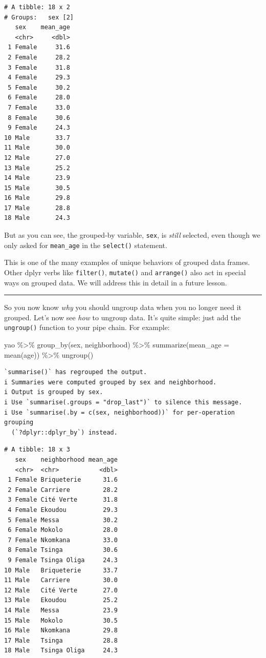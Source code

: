 \documentclass[
  letterpaper,
  DIV=11,
  numbers=noendperiod]{scrreprt}
\newenvironment{Shaded}{\begin{snugshade}}{\end{snugshade}}
\newcommand{\AttributeTok}[1]{\textcolor[rgb]{0.40,0.45,0.13}{#1}}
\newcommand{\FunctionTok}[1]{\textcolor[rgb]{0.28,0.35,0.67}{#1}}
\newcommand{\NormalTok}[1]{\textcolor[rgb]{0.00,0.23,0.31}{#1}}
\newcommand{\SpecialCharTok}[1]{\textcolor[rgb]{0.37,0.37,0.37}{#1}}
\begin{document}
\begin{verbatim}
# A tibble: 18 x 2
# Groups:   sex [2]
   sex    mean_age
   <chr>     <dbl>
 1 Female     31.6
 2 Female     28.2
 3 Female     31.8
 4 Female     29.3
 5 Female     30.2
 6 Female     28.0
 7 Female     33.0
 8 Female     30.6
 9 Female     24.3
10 Male       33.7
11 Male       30.0
12 Male       27.0
13 Male       25.2
14 Male       23.9
15 Male       30.5
16 Male       29.8
17 Male       28.8
18 Male       24.3
\end{verbatim}

But as you can see, the grouped-by variable, \texttt{sex}, is
\emph{still} selected, even though we only asked for \texttt{mean\_age}
in the \texttt{select()} statement.

This is one of the many examples of unique behaviors of grouped data
frames. Other dplyr verbs like \texttt{filter()}, \texttt{mutate()} and
\texttt{arrange()} also act in special ways on grouped data. We will
address this in detail in a future lesson.

\begin{center}\rule{0.5\linewidth}{0.5pt}\end{center}

So you now know \emph{why} you should ungroup data when you no longer
need it grouped. Let's now see \emph{how} to ungroup data. It's quite
simple: just add the \texttt{ungroup()} function to your pipe chain. For
example:

\begin{Shaded}
\begin{Highlighting}[]
\NormalTok{yao }\SpecialCharTok{\%\textgreater{}\%} 
  \FunctionTok{group\_by}\NormalTok{(sex, neighborhood) }\SpecialCharTok{\%\textgreater{}\%} 
  \FunctionTok{summarize}\NormalTok{(}\AttributeTok{mean\_age =} \FunctionTok{mean}\NormalTok{(age)) }\SpecialCharTok{\%\textgreater{}\%} 
  \FunctionTok{ungroup}\NormalTok{()}
\end{Highlighting}
\end{Shaded}

\begin{verbatim}
`summarise()` has regrouped the output.
i Summaries were computed grouped by sex and neighborhood.
i Output is grouped by sex.
i Use `summarise(.groups = "drop_last")` to silence this message.
i Use `summarise(.by = c(sex, neighborhood))` for per-operation grouping
  (`?dplyr::dplyr_by`) instead.
\end{verbatim}

\begin{verbatim}
# A tibble: 18 x 3
   sex    neighborhood mean_age
   <chr>  <chr>           <dbl>
 1 Female Briqueterie      31.6
 2 Female Carriere         28.2
 3 Female Cité Verte       31.8
 4 Female Ekoudou          29.3
 5 Female Messa            30.2
 6 Female Mokolo           28.0
 7 Female Nkomkana         33.0
 8 Female Tsinga           30.6
 9 Female Tsinga Oliga     24.3
10 Male   Briqueterie      33.7
11 Male   Carriere         30.0
12 Male   Cité Verte       27.0
13 Male   Ekoudou          25.2
14 Male   Messa            23.9
15 Male   Mokolo           30.5
16 Male   Nkomkana         29.8
17 Male   Tsinga           28.8
18 Male   Tsinga Oliga     24.3
\end{verbatim}
\end{document}
